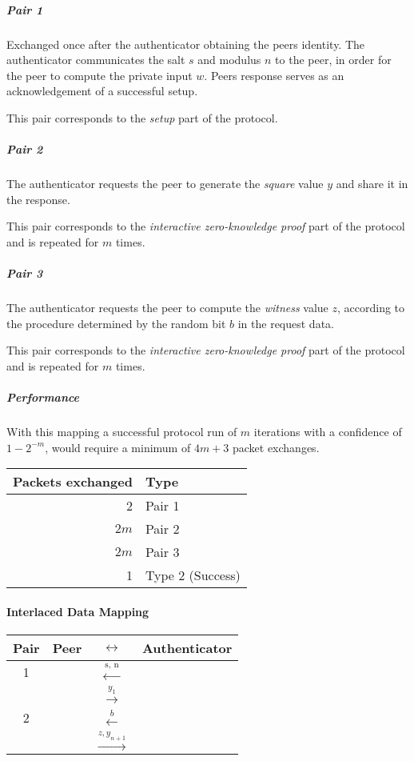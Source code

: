 \subparagraph{Pair 1} Exchanged once after the authenticator obtaining the peers identity. The authenticator communicates the salt $s$ and modulus $n$ to the peer, in order for the peer to compute the private input $w$. 
Peers response serves as an acknowledgement of a successful setup.

This pair corresponds to the \textit{setup} part of the protocol.

\subparagraph{Pair 2} The authenticator requests the peer to generate the \textit{square} value $y$ and share it in the response.

This pair corresponds to the \textit{interactive zero-knowledge proof} part of the protocol and is repeated for $m$ times. 

\subparagraph{Pair 3} The authenticator requests the peer to compute the \textit{witness} value $z$, according to the procedure determined by the random bit $b$ in the request data.

This pair corresponds to the \textit{interactive zero-knowledge proof} part of the protocol and is repeated for $m$ times.

\subparagraph{Performance}
With this mapping a successful protocol run of $m$ iterations with a confidence of $1 - 2^{-m}$, would require a minimum of $4m + 3$ packet exchanges.

\bigskip

\begin{tabular}{r|l}
	Packets exchanged & Type\\
	\hline
	2 & Pair 1\\
	$2m$ & Pair 2\\
	$2m$ & Pair 3\\
	1 & Type 2 (Success)\\
\end{tabular}

\paragraph{Interlaced Data Mapping}

\begin{center}
	\begin{tabular}{c|rcl}
	Pair & Peer  & $\leftrightarrow$ & Authenticator \\
	\hline
	1 & & $\xleftarrow{\text{s, n}}$ &\\
	&& $\xrightarrow{y_1}$&\\
	\hline
	2 & & $\xleftarrow{b}$&\\
	&& $\xrightarrow{z, y_{n+1}}$&\\
	\hline
	\end{tabular}
\end{center}

